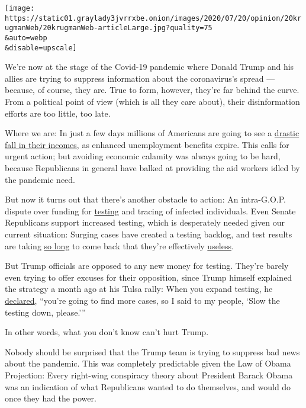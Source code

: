 \texttt{[image: https://static01.graylady3jvrrxbe.onion/images/2020/07/20/opinion/20krugmanWeb/20krugmanWeb-articleLarge.jpg?quality=75\\\&auto=webp\\\&disable=upscale]}

We're now at the stage of the Covid-19 pandemic where Donald Trump and
his allies are trying to suppress information about the coronavirus's
spread --- because, of course, they are. True to form, however, they're
far behind the curve. From a political point of view (which is all they
care about), their disinformation efforts are too little, too late.

Where we are: In just a few days millions of Americans are going to see
a
\href{https://www.nytimes3xbfgragh.onion/2020/07/16/opinion/coronavirus-economy-unemployment.html}{drastic
fall in their incomes}, as enhanced unemployment benefits expire. This
calls for urgent action; but avoiding economic calamity was always going
to be hard, because Republicans in general have balked at providing the
aid workers idled by the pandemic need.

But now it turns out that there's another obstacle to action: An
intra-G.O.P. dispute over funding for
\href{https://www.nytimes3xbfgragh.onion/2020/07/18/us/politics/trump-virus-testing-relief-congress.html}{testing}
and tracing of infected individuals. Even Senate Republicans support
increased testing, which is desperately needed given our current
situation: Surging cases have created a testing backlog, and test
results are taking
\href{https://www.nytimes3xbfgragh.onion/2020/07/19/health/coronavirus-testing-viral-spread.html}{so
long} to come back that they're effectively
\href{https://medicalxpress.com/news/2020-07-contact-useless-speedy.html}{useless}.

But Trump officials are opposed to any new money for testing. They're
barely even trying to offer excuses for their opposition, since Trump
himself explained the strategy a month ago at his Tulsa rally: When you
expand testing, he
\href{https://www.nbcnews.com/politics/2020-election/trump-tells-tulsa-crowd-he-wanted-slow-down-covid-19-n1231658}{declared},
``you're going to find more cases, so I said to my people, `Slow the
testing down, please.'''

In other words, what you don't know can't hurt Trump.

Nobody should be surprised that the Trump team is trying to suppress bad
news about the pandemic. This was completely predictable given the Law
of Obama Projection: Every right-wing conspiracy theory about President
Barack Obama was an indication of what Republicans wanted to do
themselves, and would do once they had the power.

